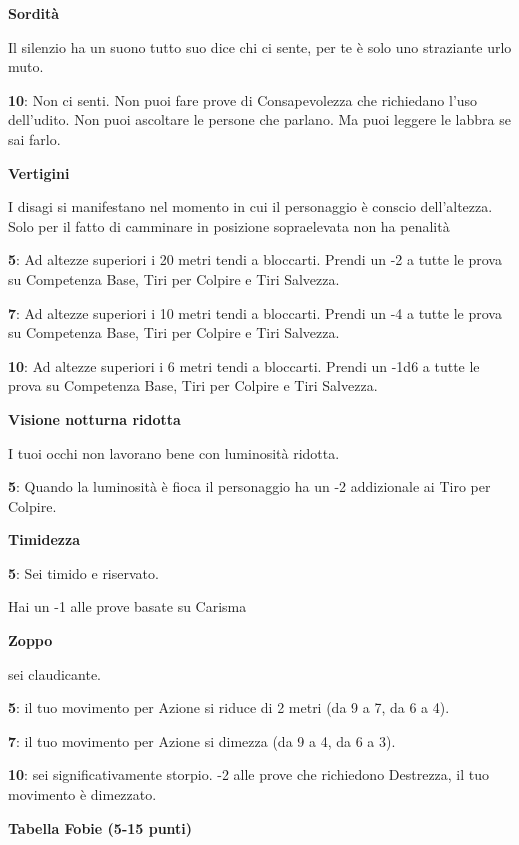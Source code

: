 \documentclass[a4paper,twoside,openany]{book}
\begin{document}
\begin{multicols}{2}
\textbf{Sordità}

Il silenzio ha un suono tutto suo dice chi ci sente, per te è solo uno straziante urlo muto.

\textbf{10}: Non ci senti. Non puoi fare prove di Consapevolezza che richiedano l'uso dell'udito. Non puoi ascoltare le persone che parlano. Ma puoi leggere le labbra se sai farlo.

\textbf{Vertigini}

I disagi si manifestano nel momento in cui il personaggio è conscio dell'altezza. Solo per il fatto di camminare in posizione sopraelevata non ha penalità

\textbf{5}: Ad altezze superiori i 20 metri tendi a bloccarti. Prendi un -2 a tutte le prova su Competenza Base, Tiri per Colpire e Tiri Salvezza.

\textbf{7}: Ad altezze superiori i 10 metri tendi a bloccarti. Prendi un -4 a tutte le prova su Competenza Base, Tiri per Colpire e Tiri Salvezza.

\textbf{10}: Ad altezze superiori i 6 metri tendi a bloccarti. Prendi un -1d6 a tutte le prova su Competenza Base, Tiri per Colpire e Tiri Salvezza.

\textbf{Visione notturna ridotta}

I tuoi occhi non lavorano bene con luminosità ridotta.

\textbf{5}: Quando la luminosità è fioca il personaggio ha un -2 addizionale ai Tiro per Colpire.

\textbf{Timidezza}

\textbf{5}: Sei timido e riservato.

Hai un -1 alle prove basate su Carisma

\textbf{Zoppo}

sei claudicante.

\textbf{5}: il tuo movimento per Azione si riduce di 2 metri (da 9 a 7, da 6 a 4).

\textbf{7}: il tuo movimento per Azione si dimezza (da 9 a 4, da 6 a 3).

\textbf{10}: sei significativamente storpio. -2 alle prove che richiedono Destrezza, il tuo movimento è dimezzato.

\end{multicols}

\bigskip

\textbf{Tabella Fobie (5-15 punti)}
\end{document}
